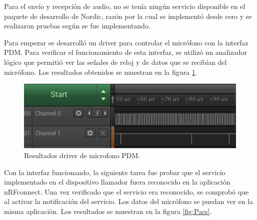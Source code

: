 Para el envío y recepción de audio, no se tenía ningún servicio disponible en el paquete de desarrollo de Nordic, razón por la cual se implementó desde cero y se realizaron pruebas según se fue implementando. 

Para empezar se desarrolló un driver para controlar el micrófono con la interfaz PDM. Para verificar el funcionamiento de esta interfaz, se utilizó un analizador lógico que permitió ver las señales de reloj y de datos que se recibían del micrófono. Los resultados obtenidos se muestran en la figura \ref{fig:Ppdm}.

\begin{figure}[htpb]
	\centering
	\includegraphics[scale=0.8]{./Figures/pdm.png}	
	\caption{Resultados driver de microfono PDM.}
	\label{fig:Ppdm}
\end{figure}

Con la interfaz funcionando, la siguiente tarea fue probar que el servicio implementado en el dispositivo llamador fuera reconocido en la aplicación nRFconnect. Una vez verificado que  el servicio era reconocido, se comprobó que al activar la notificación del servicio. Los datos del micrófono se puedan ver en la misma aplicación. Los resultados se muestran en la figura \ref{fig:Pacs}.

